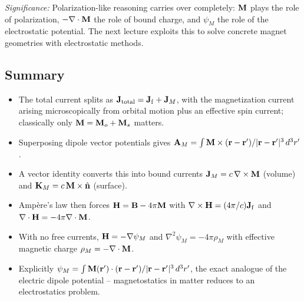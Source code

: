 \textit{Significance:} Polarization-like reasoning carries over completely:
$\mathbf{M}$ plays the role of polarization, $-\nabla\cdot\mathbf{M}$ the role of bound
charge, and $\psi_M$ the role of the electrostatic potential.  The next lecture exploits
this to solve concrete magnet geometries with electrostatic methods.

\subsection{Summary}\label{subsec:lec17-summary}

\begin{itemize}
  \item The total current splits as $\mathbf{J}_{\rm total}=\mathbf{J}_{\rm f}+\mathbf{J}_M$, with the
        magnetization current arising microscopically from orbital motion plus an
        effective spin current; classically only $\mathbf{M}=\mathbf{M}_o+\mathbf{M}_s$ matters.
  \item Superposing dipole vector potentials gives
        $\mathbf{A}_M=\int \mathbf{M}\times(\mathbf{r}-\mathbf{r}')/|\mathbf{r}-\mathbf{r}'|^3\,d^3r'$.
  \item A vector identity converts this into bound currents
        $\mathbf{J}_M=c\,\nabla\times\mathbf{M}$ (volume) and
        $\mathbf{K}_M=c\,\mathbf{M}\times\hat{\mathbf{n}}$ (surface).
  \item Amp\`ere's law then forces $\mathbf{H}=\mathbf{B}-4\pi\mathbf{M}$ with
        $\nabla\times\mathbf{H}=(4\pi/c)\mathbf{J}_{\rm f}$ and
        $\nabla\cdot\mathbf{H}=-4\pi\nabla\cdot\mathbf{M}$.
  \item With no free currents, $\mathbf{H}=-\nabla\psi_M$ and
        $\nabla^2\psi_M=-4\pi\rho_M$ with effective magnetic charge
        $\rho_M=-\nabla\cdot\mathbf{M}$.
  \item Explicitly $\psi_M=\int \mathbf{M}(\mathbf{r}')\cdot(\mathbf{r}-\mathbf{r}')/|\mathbf{r}-\mathbf{r}'|^3\,d^3r'$, the
        exact analogue of the electric dipole potential -- magnetostatics in matter
        reduces to an electrostatics problem.
\end{itemize}
